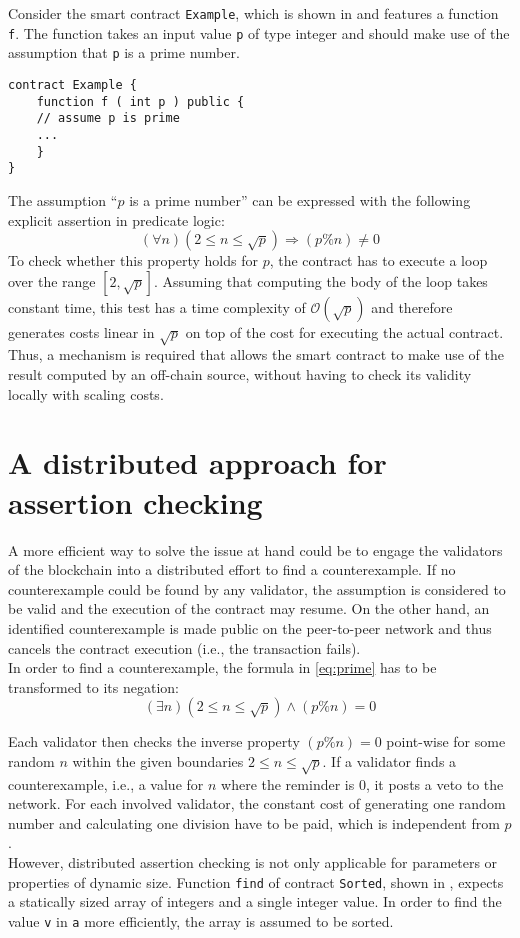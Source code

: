 Consider the smart contract \texttt{Example}, which is shown in  and features a function \texttt{f}. The function takes an input value \texttt{p} of type integer and should make use of the assumption that \texttt{p} is a prime number.
\begin{lstlisting}[caption=Smart contract with a function expecting a prime number \cite{thiemann_2020}, numbers=none, language=Solidity, label=lst:prime]
contract Example {
	function f ( int p ) public {
	// assume p is prime
	...
	}
}
\end{lstlisting}
The assumption ``$p$ is a prime number'' can be expressed with the following explicit assertion in predicate logic: 
\begin{equation}\label{eq:prime}
    (\forall n) (2 \le n \le \sqrt{p}) \Rightarrow (p \% n) \neq 0
\end{equation}
To check whether this property holds for $p$, the contract has to execute a loop over the range $[2, \sqrt{p}]$. Assuming that computing the body of the loop takes constant time, this test has a time complexity of $\mathcal{O}(\sqrt{p})$ and therefore generates costs linear in $\sqrt{p}$ on top of the cost for executing the actual contract. Thus, a mechanism is required that allows the smart contract to make use of the result computed by an off-chain source, without having to check its validity locally with scaling costs.

\section{A distributed approach for assertion checking}
A more efficient way to solve the issue at hand could be to engage the validators of the blockchain into a distributed effort to find a counterexample. If no counterexample could be found by any validator, the assumption is considered to be valid and the execution of the contract may resume. On the other hand, an identified counterexample is made public on the peer-to-peer network and thus cancels the contract execution (i.e., the transaction fails). \\
In order to find a counterexample, the formula in \eqref{eq:prime} has to be transformed to its negation:
\begin{equation}\label{eq:prime_neg}
	(\exists n) (2 \le n \le \sqrt{p}) \wedge (p \% n) = 0
\end{equation}

Each validator then checks the inverse property $(p \% n) = 0$ point-wise for some random $n$ within the given boundaries $2 \le n \le \sqrt{p}$. If a validator finds a counterexample, i.e., a value for $n$ where the reminder is $0$, it posts a veto to the network. For each involved validator, the constant cost of generating one random number and calculating one division have to be paid, which is independent from $p$. \\
However, distributed assertion checking is not only applicable for parameters or properties of dynamic size. Function \texttt{find} of contract \texttt{Sorted}, shown in , expects a statically sized array of integers and a single integer value. In order to find the value \texttt{v} in \texttt{a} more efficiently, the array is assumed to be sorted. 

